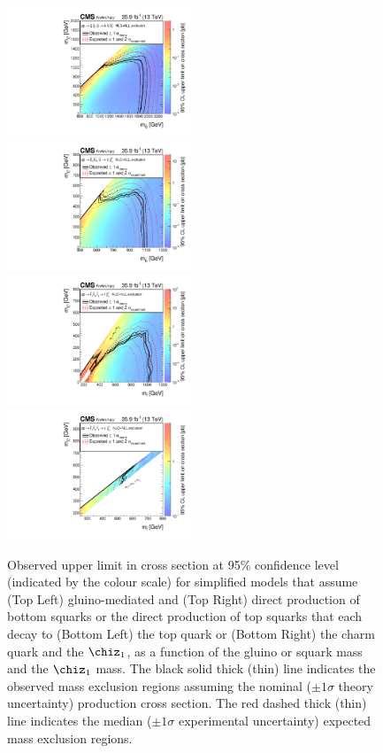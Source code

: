 \begin{figure}[!tb]
  \centering
  \includegraphics[width=0.49\textwidth]{T1bbbbRA1XSEC.pdf} ~
  \includegraphics[width=0.49\textwidth]{T2bbRA1XSEC.pdf} \\
  \includegraphics[width=0.49\textwidth]{T2ttRA1XSEC.pdf} ~
  \includegraphics[width=0.49\textwidth]{T2ccRA1XSEC.pdf} 
  \caption{Observed upper limit in cross section at 95\% confidence
    level (indicated by the colour scale) for simplified models that
    assume (Top Left) gluino-mediated and (Top Right) direct
    production of bottom squarks or the direct production of top
    squarks that each decay to (Bottom Left) the top quark or
    (Bottom Right) the charm quark and the $\chiz_{1}$, as a
    function of the gluino or squark mass and the $\chiz_{1}$ 
    mass. The black solid thick (thin) line indicates the observed
    mass exclusion regions assuming the nominal (${\pm}1 \sigma$
    theory uncertainty) production cross section. The red dashed
    thick (thin) line indicates the median (${\pm}1 \sigma$
    experimental uncertainty) expected mass exclusion
    regions. 
  }
  \label{fig:limits-sms} 
  \centering
\end{figure}

